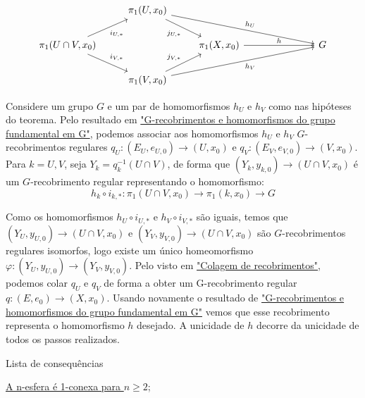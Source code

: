 \[\begin{tikzcd}
	& {\pi_1(U, x_0)} \\
	{\pi_1(U \cap V, x_0)} && {\pi_1(X, x_0)} &&& G \\
	& {\pi_1(V, x_0)}
	\arrow["{j_{U, *}}"', from=1-2, to=2-3]
	\arrow["{h_U}", from=1-2, to=2-6]
	\arrow["{i_{U, *}}"', from=2-1, to=1-2]
	\arrow["{i_{V, *}}", from=2-1, to=3-2]
	\arrow["h", from=2-3, to=2-6]
	\arrow["{j_{V, *}}", from=3-2, to=2-3]
	\arrow["{h_V}"', from=3-2, to=2-6]
\end{tikzcd}\]

\begin{dem}
    Considere um grupo $G$ e um par de homomorfismos $h_U$ e $h_V$ como nas hipóteses do teorema. Pelo resultado em \hyperref[homomorfismos-e-g-recobrimentos-prop]{"G-recobrimentos e homomorfismos do grupo fundamental em G"}, podemos associar aos homomorfismos $h_U$ e $h_V$ $G$-recobrimentos regulares $q_U:(E_U,e_{U, 0}) \longrightarrow (U, x_0)$ e $q_V:(E_V,e_{V, 0}) \longrightarrow (V, x_0)$. Para $k = U, V$, seja $Y_k = q_k^{-1}(U \cap V)$, de forma que $(Y_k, y_{k, 0}) \longrightarrow (U \cap V, x_0)$ é um $G$-recobrimento regular representando o homomorfismo: $$h_k \circ i_{k, *}:  \pi_1(U \cap V, x_0) \longrightarrow \pi_1(k, x_0) \longrightarrow G$$

    Como os homomorfismos $h_U \circ i_{U, *}$ e $h_V \circ i_{V, *}$ são iguais, temos que $(Y_U, y_{U, 0}) \longrightarrow (U \cap V, x_0)$ e $(Y_V, y_{V, 0}) \longrightarrow (U \cap V, x_0)$ são $G$-recobrimentos regulares isomorfos, logo existe um único homeomorfismo $\varphi: (Y_U, y_{U, 0}) \longrightarrow (Y_V, y_{V, 0})$. Pelo visto em \hyperref[colagem-de-recobrimentos-prop]{"Colagem de recobrimentos"}, podemos colar $q_U$ e $q_V$ de forma a obter um G-recobrimento regular $q:(E, e_0) \longrightarrow (X, x_0)$. Usando novamente o resultado de \hyperref[homomorfismos-e-g-recobrimentos-prop]{"G-recobrimentos e homomorfismos do grupo fundamental em G"} vemos que esse recobrimento representa o homomorfismo $h$ desejado. A unicidade de $h$ decorre da unicidade de todos os passos realizados.
\end{dem}

\begin{titlemize}{Lista de consequências}
	\item \hyperref[n-esfera-1-conexa-ex]{A n-esfera é 1-conexa para $n \geq 2$};
\end{titlemize}
